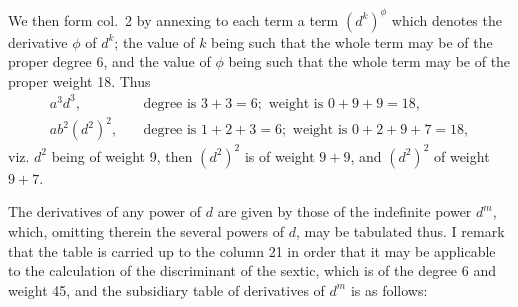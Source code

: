 \documentclass[11pt,a4paper]{article}
\theoremstyle{definition}
\begin{document}
We then form col.~2 by annexing to each term a term $(d^k)^\phi$ which denotes the derivative $\phi$ of $d^k$; the value of $k$ being such that the whole term may be of the proper degree 6, and the value of $\phi$ being such that the whole term may be of the proper weight 18. Thus
\begin{align*}
a^3d^3,\quad &\text{degree is }3+3=6;\text{ weight is }0+9+9=18,\\
ab^2(d^2)^2,\quad &\text{degree is }1+2+3=6;\text{ weight is }0+2+9+7=18,
\end{align*}
viz. $d^2$ being of weight 9, then $(d^2)^2$ is of weight $9+9$, and $(d^2)^2$ of weight $9+7$.

The derivatives of any power of $d$ are given by those of the indefinite power $d^m$, which, omitting therein the several powers of $d$, may be tabulated thus. I remark that the table is carried up to the column 21 in order that it may be applicable to the calculation of the discriminant of the sextic, which is of the degree 6 and weight 45, and the subsidiary table of derivatives of $d^m$ is as follows:
\end{document}
